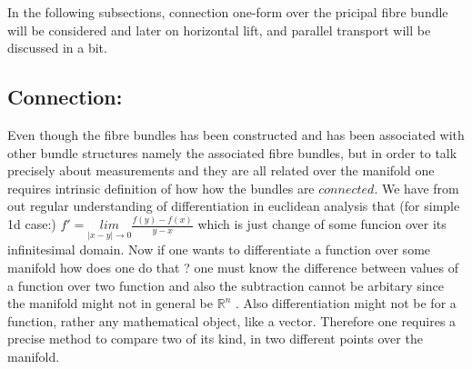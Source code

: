 \documentclass[8pt, twocoloumn]{article}
\begin{document}
In the following subsections, connection one-form over the pricipal fibre bundle will be considered and later on horizontal lift, and parallel transport will be discussed in a bit.


\subsection{Connection:}
Even though the fibre bundles has been constructed and has been associated with other bundle structures namely the associated fibre bundles, but in order to talk precisely about measurements and they are all related over the manifold one requires intrinsic definition of how how the bundles are $connected$. We have from out regular understanding of differentiation in euclidean analysis that (for simple 1d case:) $f' = \underset{|x-y|\to 0}{lim} \frac{f(y)- f(x)}{y-x}$ which is just change of some funcion over its infinitesimal domain. Now if one wants to differentiate a function over some manifold how does one do that ? one must know the difference between values of a function over two function and also the subtraction cannot be arbitary since the manifold might not in general be $\mathbb{R}^n$ . Also differentiation might not be for a function, rather any mathematical object, like a vector. Therefore one requires a precise method to compare two of its kind, in two different points over the manifold. 
\end{document}
